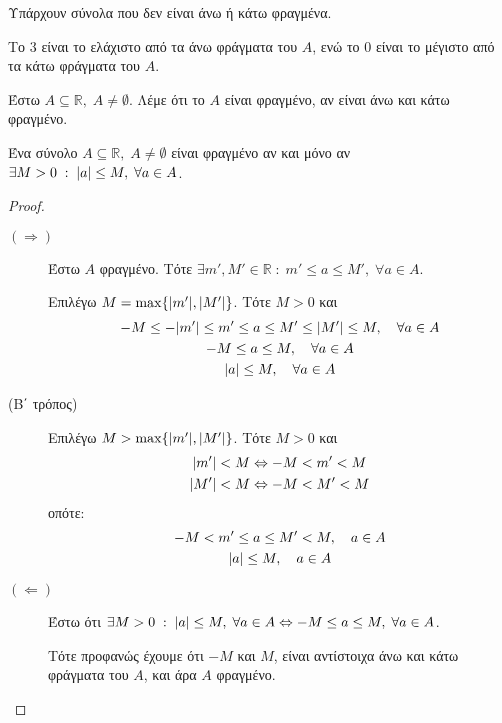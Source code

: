 \documentclass[main.tex]{subfiles}
\begin{document}

\begin{rem}
\item {}
  \begin{myitemize}
    \item Υπάρχουν σύνολα που δεν είναι άνω ή κάτω φραγμένα.
    \item Το  $ 3 $ είναι το ελάχιστο από τα άνω φράγματα του $A$, ενώ το $ 0
  $ είναι το μέγιστο από τα κάτω φράγματα του $A$. 
  \end{myitemize}
\end{rem}


\begin{mydfnbox}
Έστω $ A \subseteq \mathbb{R}, \; A \neq \emptyset $. Λέμε ότι το $A$ 
είναι φραγμένο, αν είναι άνω και κάτω φραγμένο.
\end{mydfnbox}

\begin{mypropbox}
Ένα σύνολο $ A \subseteq \mathbb{R}, \; A \neq \emptyset $ είναι 
  φραγμένο αν και μόνο αν $ \exists M>0 \; : \; \abs{a} \leq M, \; 
\forall a \in A$.
\end{mypropbox}

\begin{proof}
\item {}
  \begin{description}
    \item [$ (\Rightarrow) $] Έστω $A$ φραγμένο. Τότε 
      $ \exists m',M' \in \mathbb{R} \; : \; m' \leq a \leq M', \; 
      \forall a \in A $.

      Επιλέγω $ M = \max \{ \abs{m'}, \abs{M'} \} $. Τότε $ M >0 $ και 
      \begin{gather*}
        -M \leq - \abs{m'} \leq m' \leq a \leq M' \leq \abs{M'} 
        \leq M, \quad \forall a \in A \\
        -M \leq a \leq M, \quad \forall a \in A \\
        \abs{a} \leq M, \quad \forall a \in A
      \end{gather*}

    \item [(Β΄ τρόπος)]
      Επιλέγω $ M > \max \{ \abs{m'}, \abs{M'} \} $. Τότε $ M >0 $ και 
      \begin{gather*}
        \abs{m'} < M \Leftrightarrow - M < m' < M \\
        \abs{M'} < M \Leftrightarrow -M < M' < M 
      \end{gather*}
      οπότε: 
      \begin{gather*}
        -M < m' \leq a \leq M' < M, \quad a \in A \\
        \abs{a} \leq M, \quad a \in A
      \end{gather*}

    \item [$ (\Leftarrow) $]
      Έστω ότι $ \exists M>0 \; : \; \abs{a} \leq M, \; \forall a \in 
      A \Leftrightarrow -M \leq a \leq M, \; \forall a \in A$. 

      Τότε προφανώς έχουμε ότι $-M $ και $ M $, 
      είναι αντίστοιχα άνω και κάτω φράγματα του $A$, και άρα $A$ 
      φραγμένο.
  \end{description} 
\end{proof}
\end{document}
